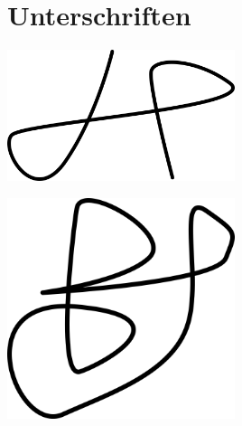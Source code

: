 \newpage

\section{Unterschriften}

\vspace*{\fill}
\begin{minipage}[b][5cm][b]{0.5\textwidth}
\flushleft
\includegraphics[width=0.5\textwidth]{Bilder/anderes/Unterschrift_A.png}

\Namea

\end{minipage}
\begin{minipage}[b][5cm][b]{0.5\textwidth}
\flushright
\includegraphics[width=0.5\textwidth]{Bilder/anderes/Unterschrift_B.png}

\Nameb

\end{minipage}